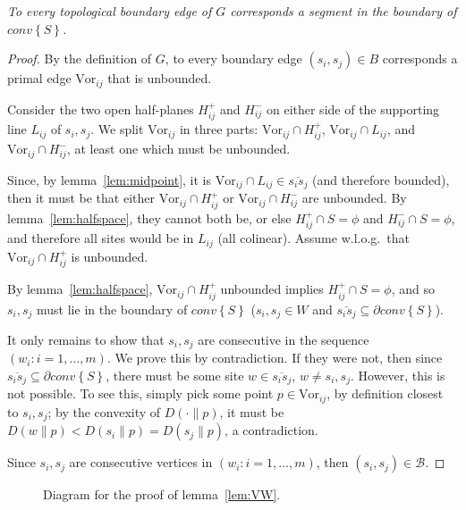 \documentclass[11pt]{article}
\newcommand{\Sites}{S}
\newcommand{\Vor}{\text{Vor}}
\newcommand{\D}[2]{D\left(#1 \parallel #2\right)}
\newcommand{\CHS}{{conv}\left\{\Sites\right\}}
\begin{document}
\emph{	To every topological boundary edge of $G$ corresponds a segment in the boundary of $\CHS$.
}
\begin{proof}
By the definition of $G$, 
to every boundary edge $(s_i,s_j)\in B$ corresponds a primal edge $\Vor_{ij}$
that is unbounded. 


Consider the two open half-planes $H^{+}_{ij}$ and $H^{-}_{ij}$ on either
side of the supporting line $L_{ij}$ of $s_i,s_j$. 
We split $\Vor_{ij}$ in three parts: $\Vor_{ij}\cap H^{+}_{ij}$, $\Vor_{ij}\cap L_{ij}$, and $\Vor_{ij}\cap H^{-}_{ij}$, 
	at least one which must be unbounded. 
	
Since, by lemma~\ref{lem:midpoint}, it is $\Vor_{ij}\cap L_{ij} \in \overline{s_i s_j}$ (and therefore bounded), 
	then it must be that either $\Vor_{ij}\cap H^{+}_{ij}$ or $\Vor_{ij}\cap H^{-}_{ij}$ are unbounded. 
By lemma~\ref{lem:halfspace}, they cannot both be, or else 
$H^{+}_{ij}\cap \Sites=\phi$ and $H^{-}_{ij}\cap \Sites=\phi$, and therefore all sites
would be in $L_{ij}$ (all colinear). 
Assume w.l.o.g.\  that $\Vor_{ij}\cap H^{+}_{ij}$ is unbounded. 

By lemma~\ref{lem:halfspace}, $\Vor_{ij}\cap H^{+}_{ij}$ unbounded implies 
$H^{+}_{ij}\cap \Sites=\phi$, and 
so $s_i,s_j$ must lie in the boundary of $\CHS$ 
($s_i,s_j\in W$ and $\overline{s_i s_j}\subseteq\partial\CHS$). 


It only remains to show that $s_i,s_j$ are consecutive in the sequence $(w_i :
i=1,\dots,m)$. 
We prove this by contradiction. 
If they were not, then since $\overline{s_i s_j}\subseteq\partial\CHS$, 
there must be some site $w\in \overline{s_i s_j}$, $w\neq s_i,s_j$. 
However, this is not possible. 
To see this, simply pick some point $p\in \Vor_{ij}$, by definition closest to $s_i,s_j$;
 by the convexity of $\D{\cdot}{p}$, it must be $\D{w}{p} < \D{s_i}{p}=\D{s_j}{p}$, a contradiction. 

Since $s_i,s_j$ are consecutive vertices in $(w_i : i=1,\dots,m)$, then 
$(s_i,s_j)\in\mathcal{B}$. 
\end{proof}







\begin{figure}
\centering
{}
\quad\quad
{}
\label{fig:VW}
\caption{Diagram for the proof of lemma~\ref{lem:VW}.}
\end{figure}
\end{document}
